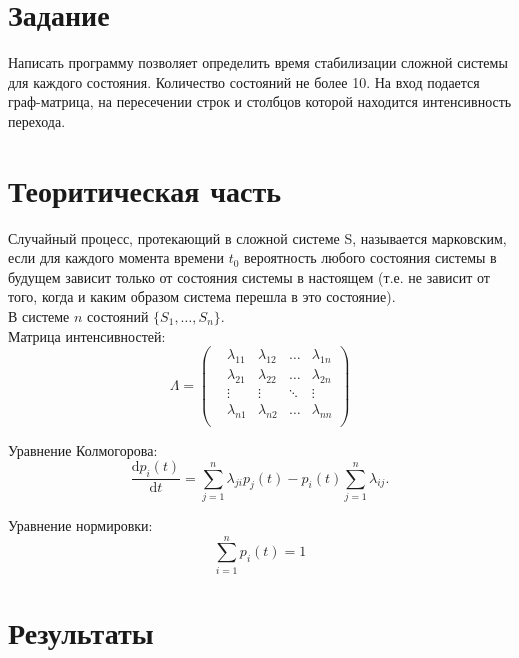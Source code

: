 \section{Задание}

Написать программу позволяет определить время стабилизации сложной системы для каждого состояния.
Количество состояний не более 10.
На вход подается граф-матрица, на пересечении строк и столбцов которой находится интенсивность перехода.


\section{Теоритическая часть}

Случайный процесс, протекающий в сложной системе S, называется марковским, если для каждого момента времени
$t_0$ вероятность любого состояния системы в будущем зависит только от состояния системы в настоящем
(т.е. не зависит от того, когда и каким образом система перешла в это состояние).\\

В системе $n$ состояний $\{S_1, \ldots, S_n\}$.\\

Матрица интенсивностей:
\begin{equation*}
    \Lambda = \begin{pmatrix}
        &\lambda_{11} &\lambda_{12} &\ldots &\lambda_{1n} \\
        &\lambda_{21} &\lambda_{22} &\ldots &\lambda_{2n} \\
        &\vdots       &\vdots       &\ddots &\vdots       \\
        &\lambda_{n1} &\lambda_{n2} &\ldots &\lambda_{nn} \\
    \end{pmatrix}
\end{equation*}

Уравнение Колмогорова:
\begin{equation*}
    \frac{\mathrm dp_i(t)}{\mathrm dt} = \sum_{j = 1}^{n} \lambda_{ji} p_j(t) - p_i(t) \sum_{j = 1}^{n} \lambda_{ij}.
\end{equation*}

Уравнение нормировки:
\begin{equation*}
	\label{eqn:norm}
	\sum_{i = 1}^{n} p_i(t) = 1
\end{equation*}


\pagebreak
\section{Результаты}

